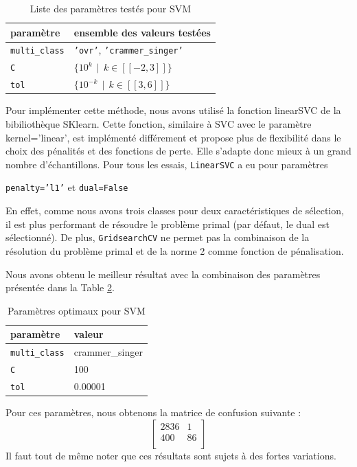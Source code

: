 \documentclass[a4paper]{report}
\begin{document}
\begin{table}[h]
\centering
\begin{tabular}{ll}
paramètre & ensemble des valeurs testées \\
\hline
\texttt{multi\_class} & \texttt{'ovr'}, \texttt{'crammer\_singer'} \\
\texttt{C} & $\{10^k \>\> | \>\> k \in [\![-2, 3]\!] \}$ \\
\texttt{tol} & $\{10^{-k} \>\> | \>\> k \in [\![3, 6]\!] \}$ \\
\end{tabular}
\caption{Liste des paramètres testés pour SVM\label{params_svm}}
\end{table}

\noindent Pour implémenter cette méthode, nous avons utilisé la fonction linearSVC de la bibiliothèque SKlearn. Cette fonction, similaire à SVC avec le paramètre kernel='linear', est implémenté différement et propose plus de flexibilité dans le choix des pénalités et des fonctions de perte. Elle s'adapte donc mieux à un grand nombre d'échantillons. Pour tous les essais, \texttt{LinearSVC} a eu pour paramètres \begin{center}
\texttt{penalty='l1'} et \texttt{dual=False}
\end{center}
En effet, comme nous avons trois classes pour deux caractéristiques de sélection, il est plus performant de résoudre le problème primal (par défaut, le dual est sélectionné). De plus, \texttt{GridsearchCV} ne permet pas la combinaison de la résolution du problème primal et de la norme 2 comme fonction de pénalisation. %

Nous avons obtenu le meilleur résultat avec la combinaison des paramètres présentée dans la Table \ref{best_params_svm}.

\begin{table}[h]
\centering
\begin{tabular}{ll}
paramètre & valeur \\
\hline
\texttt{multi\_class} & crammer\_singer \\
\texttt{C} & 100 \\
\texttt{tol} & 0.00001\\
\end{tabular}
\caption{Paramètres optimaux pour SVM\label{best_params_svm}}
\end{table}

Pour ces paramètres, nous obtenons la matrice de confusion suivante :
$$\begin{bmatrix}
2836 & 1 \\ 
400 & 86 \\
\end{bmatrix}$$
Il faut tout de même noter que ces résultats sont sujets à des fortes variations.
\end{document}
